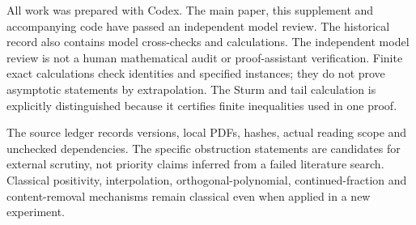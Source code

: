 All work was prepared with Codex. The main paper, this supplement and
accompanying code have passed an independent model review. The historical
record also contains model cross-checks and calculations. The independent
model review is not a human mathematical audit or proof-assistant
verification. Finite exact
calculations check identities and specified instances; they do not
prove asymptotic statements by extrapolation. The Sturm and tail
calculation is explicitly distinguished because it certifies finite
inequalities used in one proof.

The source ledger records versions, local PDFs, hashes, actual reading
scope and unchecked dependencies. The specific obstruction statements
are candidates for external scrutiny, not priority claims inferred from
a failed literature search. Classical positivity, interpolation,
orthogonal-polynomial, continued-fraction and content-removal mechanisms
remain classical even when applied in a new experiment.
